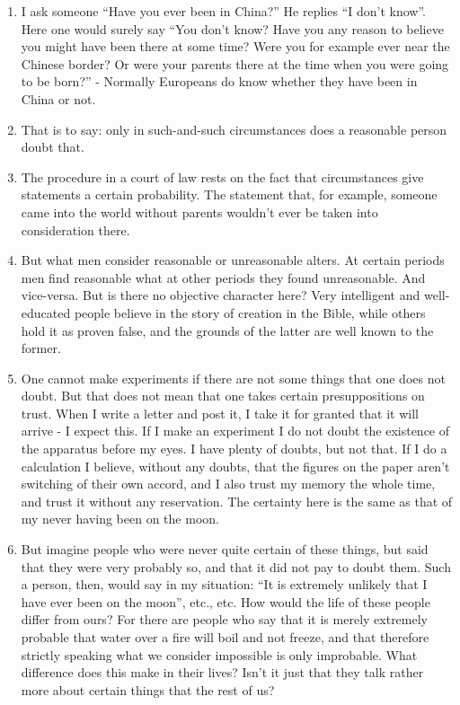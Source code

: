 \documentclass{book}
\begin{document}
\begin{enumerate}
\item
I ask someone ``Have you ever been in China?'' He replies ``I don't know''.
Here one would surely say ``You don't know? Have you any reason to believe you
might have been there at some time? Were you for example ever near the Chinese
border? Or were your parents there at the time when you were going to be
born?'' - Normally Europeans do know whether they have been in China or not.

\item
That is to say: only in such-and-such circumstances does a reasonable person
doubt that.

\item
The procedure in a court of law rests on the fact that circumstances give
statements a certain probability. The statement that, for example, someone came
into the world without parents wouldn't ever be taken into consideration there.

\item
But what men consider reasonable or unreasonable alters. At certain periods men
find reasonable what at other periods they found unreasonable. And vice-versa.
But is there no objective character here?  Very intelligent and well-educated
people believe in the story of creation in the Bible, while others hold it as
proven false, and the grounds of the latter are well known to the former.

\item
One cannot make experiments if there are not some things that one does not
doubt. But that does not mean that one takes certain presuppositions on trust.
When I write a letter and post it, I take it for granted that it will arrive -
I expect this.  If I make an experiment I do not doubt the existence of the
apparatus before my eyes. I have plenty of doubts, but not that. If I do a
calculation I believe, without any doubts, that the figures on the paper aren't
switching of their own accord, and I also trust my memory the whole time, and
trust it without any reservation. The certainty here is the same as that of my
never having been on the moon.

\item
But imagine people who were never quite certain of these things, but said that
they were very probably so, and that it did not pay to doubt them. Such a
person, then, would say in my situation: ``It is extremely unlikely that I have
ever been on the moon'', etc., etc. How would the life of these people differ
from ours? For there are people who say that it is merely extremely probable
that water over a fire will boil and not freeze, and that therefore strictly
speaking what we consider impossible is only improbable. What difference does
this make in their lives? Isn't it just that they talk rather more about
certain things that the rest of us?


\end{enumerate}
\end{document}
